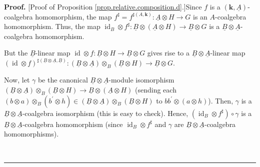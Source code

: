 \documentclass[numbers=enddot,12pt,final,onecolumn,notitlepage,abstracton]{scrartcl}%
\theoremstyle{definition}
\newenvironment{proof}[1][Proof]{\noindent\textbf{#1.} }{\ \rule{0.5em}{0.5em}}
\begin{document}
\begin{proof}
[Proof of Proposition \ref{prop.relative.composition.d}.]Since $f$ is a
$\left(  \mathbf{k},\underline{A}\right)  $-coalgebra homomorphism, the map
$f^{\sharp}=f^{\sharp\left(  A,\mathbf{k}\right)  }:\underline{A}\otimes
H\rightarrow G$ is an $A$-coalgebra homomorphism. Thus, the map
$\operatorname*{id}\nolimits_{B}\otimes f^{\sharp}:\underline{B}\otimes\left(
\underline{A}\otimes H\right)  \rightarrow\underline{B}\otimes G$ is a
$\underline{B}\otimes\underline{A}$-coalgebra homomorphism.

But the $\underline{B}$-linear map $\operatorname*{id}\otimes f:\underline{B}%
\otimes H\rightarrow\underline{B}\otimes G$ gives rise to a $\underline{B}%
\otimes\underline{A}$-linear map $\left(  \operatorname*{id}\otimes f\right)
^{\sharp\left(  \underline{B}\otimes\underline{A},\underline{B}\right)
}:\left(  \underline{B}\otimes\underline{A}\right)  \otimes_{B}\left(
\underline{B}\otimes H\right)  \rightarrow\underline{B}\otimes G$.

Now, let $\gamma$ be the canonical $\underline{B}\otimes\underline{A}$-module
isomorphism $\left(
\underline{B}\otimes\underline{A}\right)  \otimes_{B}\left(  \underline{B}%
\otimes H\right)  \rightarrow\underline{B}\otimes\left(  \underline{A}\otimes
H\right)  $ (sending each $\left(  b\otimes a\right)  \otimes_{B}\left(
b^{\prime}\otimes h\right)  \in\left(  \underline{B}\otimes\underline{A}%
\right)  \otimes_{B}\left(  \underline{B}\otimes H\right)  $ to $bb^{\prime
}\otimes\left(  a\otimes h\right)  $). Then, $\gamma$ is a $\underline{B}%
\otimes\underline{A}$-coalgebra isomorphism (this is easy to check). Hence,
$\left(  \operatorname*{id}\nolimits_{B}\otimes f^{\sharp}\right)  \circ
\gamma$ is a $\underline{B}\otimes\underline{A}$-coalgebra homomorphism (since
$\operatorname*{id}\nolimits_{B}\otimes f^{\sharp}$ and $\gamma$ are
$\underline{B}\otimes\underline{A}$-coalgebra homomorphisms).


\end{proof}
\end{document}
